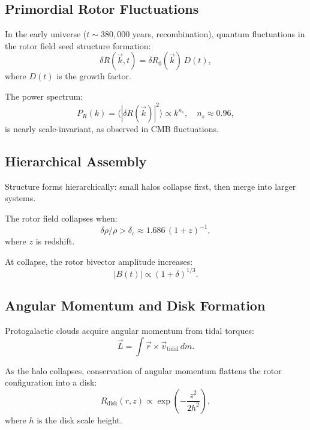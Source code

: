 \documentclass[12pt,a4paper]{article}
\theoremstyle{definition}
\theoremstyle{remark}
\begin{document}
\subsection{Primordial Rotor Fluctuations}

In the early universe ($t \sim 380,000$ years, recombination), quantum fluctuations in the rotor field seed structure formation:
\begin{equation}
\delta R(\vec{k}, t) = \delta R_0(\vec{k}) \, D(t),
\end{equation}
where $D(t)$ is the growth factor.

The power spectrum:
\begin{equation}
P_R(k) = \langle |\delta R(\vec{k})|^2 \rangle \propto k^{n_s}, \quad n_s \approx 0.96,
\end{equation}
is nearly scale-invariant, as observed in CMB fluctuations.

\subsection{Hierarchical Assembly}

Structure forms hierarchically: small halos collapse first, then merge into larger systems.

The rotor field collapses when:
\begin{equation}
\delta \rho / \rho > \delta_c \approx 1.686 \, (1 + z)^{-1},
\end{equation}
where $z$ is redshift.

At collapse, the rotor bivector amplitude increases:
\begin{equation}
|B(t)| \propto (1 + \delta)^{1/3}.
\end{equation}

\subsection{Angular Momentum and Disk Formation}

Protogalactic clouds acquire angular momentum from tidal torques:
\begin{equation}
\vec{L} = \int \vec{r} \times \vec{v}_{\text{tidal}} \, dm.
\end{equation}

As the halo collapses, conservation of angular momentum flattens the rotor configuration into a disk:
\begin{equation}
R_{\text{disk}}(r, z) \propto \exp\left(-\frac{z^2}{2h^2}\right),
\end{equation}
where $h$ is the disk scale height.
\end{document}
